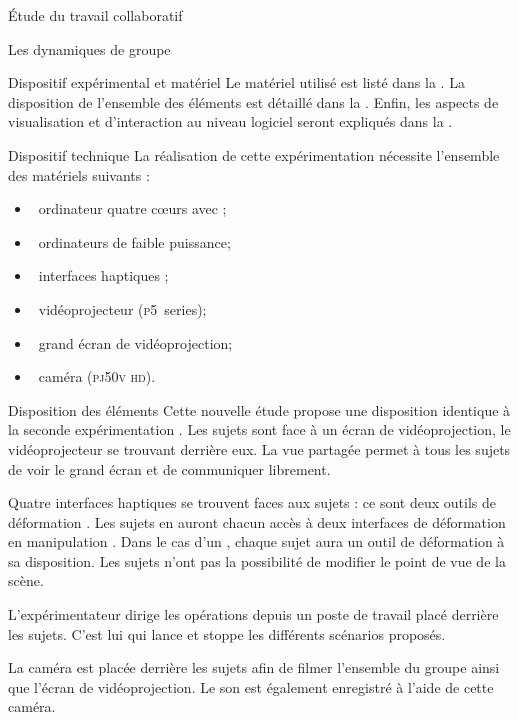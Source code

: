 \documentclass[myfrancais]{mythesis}
\begin{document}
\begin{mypart}{Étude du travail collaboratif}
\begin{mychapter}{Les dynamiques de groupe}
\begin{mysection}{Dispositif expérimental et matériel}
				Le matériel utilisé est listé dans la .
				La disposition de l'ensemble des éléments est détaillé dans la .
				Enfin, les aspects de visualisation et d'interaction au niveau logiciel seront expliqués dans la .
				\begin{mysubsection}{Dispositif technique}
					La réalisation de cette expérimentation nécessite l'ensemble des matériels suivants :
					\begin{itemize}
						\item {}~ordinateur quatre cœurs \myIntelCore avec ;
						\item {}~ordinateurs de faible puissance;
						\item {}~interfaces haptiques \myOmni;
						\item {}~vidéoprojecteur \myACER (\textsc{p5}~series);
						\item {}~grand écran de vidéoprojection;
						\item {}~caméra \mySony (\textsc{pj50v hd}).
					\end{itemize}
				\end{mysubsection}
				\begin{mysubsection}{Disposition des éléments}
					Cette nouvelle étude propose une disposition identique à la seconde expérimentation .
					Les sujets sont face à un écran de vidéoprojection, le vidéoprojecteur se trouvant derrière eux.
					La vue partagée permet à tous les sujets de voir le grand écran et de communiquer librement.

					Quatre interfaces haptiques se trouvent faces aux sujets : ce sont deux outils de déformation  .
					Les sujets en  auront chacun accès à deux interfaces de déformation en manipulation .
					Dans le cas d'un , chaque sujet aura un outil de déformation à sa disposition.
					Les sujets n'ont pas la possibilité de modifier le point de vue de la scène.

					L'expérimentateur dirige les opérations depuis un poste de travail placé derrière les sujets.
					C'est lui qui lance et stoppe les différents scénarios proposés.

					La caméra est placée derrière les sujets afin de filmer l'ensemble du groupe ainsi que l'écran de vidéoprojection.
					Le son est également enregistré à l'aide de cette caméra.


\end{mysubsection}
\end{mysection}
\end{mychapter}
\end{mypart}
\end{document}
